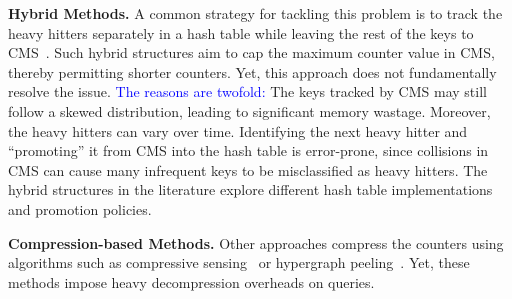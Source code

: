 \documentclass[sigconf]{acmart}
\begin{document}
\textbf{Hybrid Methods.}
A common strategy for tackling this problem is to track the heavy hitters
separately in a hash table while leaving the rest of the keys to
CMS~\cite{AugmentedSketch,HeavyKeeper,HeavyGuardian,MVSketch,WavingSketch,ElasticSketch}.
Such hybrid structures aim to cap the maximum counter value in CMS, thereby
permitting shorter counters. Yet, this approach does not fundamentally resolve
the issue. \textcolor{blue}{The reasons are twofold:} The keys tracked by CMS
may still follow a skewed distribution, leading to significant memory wastage.
Moreover, the heavy hitters can vary over time. Identifying the next heavy
hitter and ``promoting'' it from CMS into the hash table is error-prone, since
collisions in CMS can cause many infrequent keys to be misclassified as heavy
hitters. The hybrid structures in the literature explore different hash table
implementations and promotion policies.

\textbf{Compression-based Methods.}
Other approaches compress the counters using algorithms such as compressive
sensing~\cite{TreeSensing,BitSense} or hypergraph peeling~\cite{CodingSketch}.
Yet, these methods impose heavy decompression overheads on queries.
\end{document}
